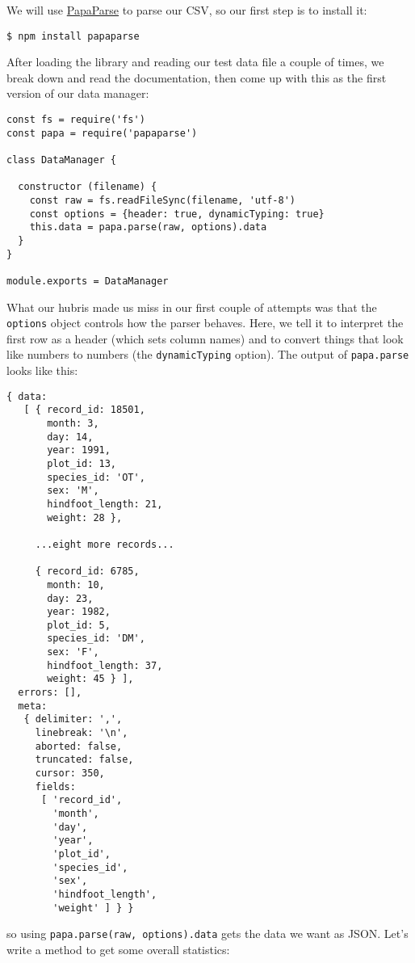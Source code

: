 We will use \href{https://www.papaparse.com/}{PapaParse} to parse our CSV,
so our first step is to install it:

\begin{verbatim}
$ npm install papaparse
\end{verbatim}

After loading the library and reading our test data file a couple of times,
we break down and read the documentation,
then come up with this as the first version of our data manager:

\begin{verbatim}
const fs = require('fs')
const papa = require('papaparse')

class DataManager {

  constructor (filename) {
    const raw = fs.readFileSync(filename, 'utf-8')
    const options = {header: true, dynamicTyping: true}
    this.data = papa.parse(raw, options).data
  }
}

module.exports = DataManager
\end{verbatim}

What our hubris made us miss in our first couple of attempts was that
the \texttt{options} object controls how the parser behaves.
Here,
we tell it to interpret the first row as a header (which sets column names)
and to convert things that look like numbers to numbers (the \texttt{dynamicTyping} option).
The output of \texttt{papa.parse} looks like this:

\begin{verbatim}
{ data:
   [ { record_id: 18501,
       month: 3,
       day: 14,
       year: 1991,
       plot_id: 13,
       species_id: 'OT',
       sex: 'M',
       hindfoot_length: 21,
       weight: 28 },

     ...eight more records...

     { record_id: 6785,
       month: 10,
       day: 23,
       year: 1982,
       plot_id: 5,
       species_id: 'DM',
       sex: 'F',
       hindfoot_length: 37,
       weight: 45 } ],
  errors: [],
  meta:
   { delimiter: ',',
     linebreak: '\n',
     aborted: false,
     truncated: false,
     cursor: 350,
     fields:
      [ 'record_id',
        'month',
        'day',
        'year',
        'plot_id',
        'species_id',
        'sex',
        'hindfoot_length',
        'weight' ] } }
\end{verbatim}

\noindent
so using \texttt{papa.parse(raw,\ options).data} gets the data we want as JSON.
Let's write a method to get some overall statistics:

